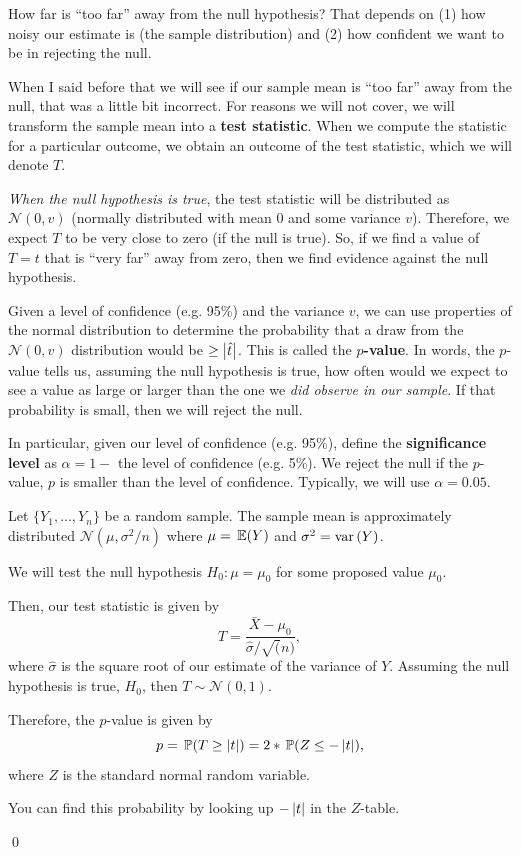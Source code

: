 \documentclass[12pt]{article}
\begin{document}
How far is ``too far'' away from the null hypothesis? That depends on (1) how noisy our estimate is (the sample distribution) and (2) how confident we want to be in rejecting the null. 

When I said before that we will see if our sample mean is ``too far'' away from the null, that was a little bit incorrect. For reasons we will not cover, we will transform the sample mean into a \textbf{test statistic}. When we compute the statistic for a particular outcome, we obtain an outcome of the test statistic, which we will denote $T$. 

\emph{When the null hypothesis is true}, the test statistic will be distributed as $\mathcal{N}(0, v)$ (normally distributed with mean $0$ and some variance $v$). Therefore, we expect $T$ to be very close to zero (if the null is true). So, if we find a value of $T = t$ that is ``very far'' away from zero, then we find evidence against the null hypothesis. 

Given a level of confidence (e.g. 95\%) and the variance $v$, we can use properties of the normal distribution to determine the probability that a draw from the $\mathcal{N}(0, v)$ distribution would be $\geq \left\lvert \hat{t} \right\rvert$. This is called the \textbf{$p$-value}. In words, the $p$-value tells us, assuming the null hypothesis is true, how often would we expect to see a value as large or larger than the one we \emph{did observe in our sample}. If that probability is small, then we will reject the null.

In particular, given our level of confidence (e.g. 95\%), define the \textbf{significance level} as $\alpha = 1 -$ the level of confidence (e.g. 5\%). We reject the null if the $p$-value, $p$ is smaller than the level of confidence. Typically, we will use $\alpha = 0.05$. 

\begin{example}
  Let $\{ Y_1, \dots, Y_n \}$ be a random sample. The sample mean is approximately distributed $\mathcal{N}(\mu, \sigma^2 / n)$ where $\mu = \expec{Y}$ and $\sigma^2 = \var{Y}$. 

  We will test the null hypothesis $H_0: \mu = \mu_0$ for some proposed value $\mu_0$.

  Then, our test statistic is given by 
  $$
    T = \frac{\bar{X} - \mu_0}{\hat{\sigma} / \sqrt(n)},
  $$
  where $\hat{\sigma}$ is the square root of our estimate of the variance of $Y$. Assuming the null hypothesis is true, $H_0$, then $T \sim \mathcal{N}(0, 1)$.

  Therefore, the $p$-value is given by
  $$
    p = \prob{T \geq \abs{t}} = 2 * \prob{Z \leq -\abs{t}},
  $$
  where $Z$ is the standard normal random variable. 

  You can find this probability by looking up $-\left\lvert t \right\rvert$ in the $Z$-table.

  \qed
\end{example}
\end{document}
